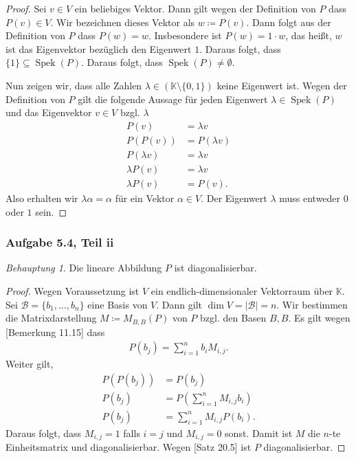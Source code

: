 \documentclass[draft,a5paper]{article}
\theoremstyle{remark}
\newtheorem*{beh}{Behauptung}
\DeclareMathOperator{\Spek}{Spek}
\newcommand{\envert}[1]{\left\lvert#1\right\rvert}
\begin{document}
\begin{proof}
  Sei \(v \in V\) ein beliebiges Vektor.  Dann gilt wegen der Definition
  von \(P\) dass \(P(v) \in V\).  Wir bezeichnen dieses Vektor als \(w
  \coloneq P(v)\).  Dann folgt aus der Definition von \(P\) dass \(P(w) =
  w\).  Insbesondere ist \(P(w) = 1 \cdot w\), das heißt, \(w\) ist das
  Eigenvektor bezüglich den Eigenwert \(1\).  Daraus folgt, dass
  \(\{1\} \subseteq \Spek(P)\).  Daraus folgt, dass \(\Spek(P) \ne \emptyset\).

  Nun zeigen wir, dass alle Zahlen \(\lambda \in (\mathbb{K} \setminus \{0, 1\})\) keine
  Eigenwert ist. Wegen der Definition von \(P\) gilt die folgende
  Aussage für jeden Eigenwert \(\lambda \in \Spek(P)\) und das Eigenvektor
  \(v \in V\) bzgl. \(\lambda\)
  \begin{align*}
    P(v) &= \lambda v \tag*{\(v\) ist Eigenvektor bzgl. \(\lambda\)} \\
    P(P(v)) &= P(\lambda v) \\
    P(\lambda v) &= \lambda v \tag*{\(P\) Projektion} \\
    \lambda P(v) &= \lambda v \tag*{\(P\) linear} \\
    \lambda P(v) &= P(v).
  \end{align*}
  Also erhalten wir \(\lambda \alpha = \alpha\) für ein Vektor
  \(\alpha \in V\). Der Eigenwert \(\lambda\) muss entweder \(0\) oder \(1\) sein.
\end{proof}

\subsubsection*{Aufgabe 5.4, Teil ii}

\begin{beh}
  Die lineare Abbildung \(P\) ist diagonalisierbar.
\end{beh}

\begin{proof}
  Wegen Voraussetzung ist \(V\) ein endlich-dimensionaler Vektorraum
  über \(\mathbb{K}\).  Sei \(\mathcal{B} = \{b_{1}, \ldots, b_{n}\}\) eine Basis von
  \(V\).  Dann gilt \(\dim V = \envert{\mathcal{B} } = n\).  Wir bestimmen die
  Matrixdarstellung \(M \coloneq M_{B,B}(P)\) von \(P\) bzgl. den Basen
  \(B, B\).  Es gilt wegen [Bemerkung 11.15] dass
  \begin{align*}
    P(b_{j}) = \sum_{i=1}^{n}{b_{i}M_{i,j}}.
  \end{align*}
  Weiter gilt,
  \begin{align*}
    P(P(b_{j}))
    &= P(b_{j})  \tag*{\(P\) Projektion} \\
    P(b_{j}) &= P(\sum_{i=1}^{n}{M_{i,j}b_{i}}) \\
    P(b_{j}) &= \sum_{i=1}^{n}{M_{i,j}P(b_{i})}. \tag*{\(P\) linear}
  \end{align*}
  Daraus folgt, dass \(M_{i,j} = 1\) falls \(i = j\) und
  \(M_{i,j} = 0\) sonst.  Damit ist \(M\) die \(n\)-te Einheitsmatrix
  und diagonalisierbar.  Wegen [Satz 20.5] ist \(P\) diagonalisierbar.
\end{proof}
\end{document}
